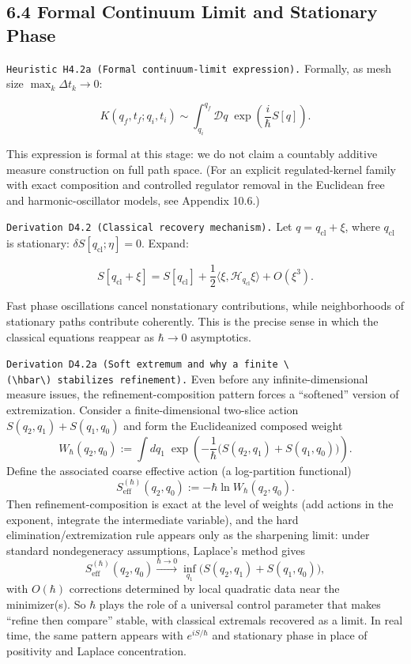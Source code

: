 \documentclass[
]{article}
\begin{document}
\subsection{6.4 Formal Continuum Limit and Stationary
Phase}\label{formal-continuum-limit-and-stationary-phase}

\texttt{Heuristic\ H4.2a\ (Formal\ continuum-limit\ expression).}
Formally, as mesh size \(\max_k\Delta t_k\to0\):

\[
K(q_f,t_f;q_i,t_i)\sim
\int_{q_i}^{q_f}\mathcal Dq\;
\exp\!\left(\frac{i}{\hbar}S[q]\right).
\]

This expression is formal at this stage: we do not claim a countably
additive measure construction on full path space. (For an explicit
regulated-kernel family with exact composition and controlled regulator
removal in the Euclidean free and harmonic-oscillator models, see
Appendix 10.6.)

\texttt{Derivation\ D4.2\ (Classical\ recovery\ mechanism).} Let
\(q=q_{\mathrm{cl}}+\xi\), where \(q_{\mathrm{cl}}\) is stationary:
\(\delta S[q_{\mathrm{cl}};\eta]=0\). Expand:

\[
S[q_{\mathrm{cl}}+\xi]
=S[q_{\mathrm{cl}}]
+\frac12\langle \xi,\mathcal H_{q_{\mathrm{cl}}}\xi\rangle
+O(\xi^3).
\]

Fast phase oscillations cancel nonstationary contributions, while
neighborhoods of stationary paths contribute coherently. This is the
precise sense in which the classical equations reappear as \(\hbar\to0\)
asymptotics.

\texttt{Derivation\ D4.2a\ (Soft\ extremum\ and\ why\ a\ finite\ \textbackslash{}(\textbackslash{}hbar\textbackslash{})\ stabilizes\ refinement).}
Even before any infinite-dimensional measure issues, the
refinement-composition pattern forces a ``softened'' version of
extremization. Consider a finite-dimensional two-slice action
\(S(q_2,q_1)+S(q_1,q_0)\) and form the Euclideanized composed weight \[
W_\hbar(q_2,q_0):=\int dq_1\;\exp\!\left(-\frac{1}{\hbar}\big(S(q_2,q_1)+S(q_1,q_0)\big)\right).
\] Define the associated coarse effective action (a log-partition
functional) \[
S_{\mathrm{eff}}^{(\hbar)}(q_2,q_0):=-\hbar\ln W_\hbar(q_2,q_0).
\] Then refinement-composition is exact at the level of weights (add
actions in the exponent, integrate the intermediate variable), and the
hard elimination/extremization rule appears only as the sharpening
limit: under standard nondegeneracy assumptions, Laplace's method gives
\[
S_{\mathrm{eff}}^{(\hbar)}(q_2,q_0)
\xrightarrow{\hbar\to0}
\inf_{q_1}\big(S(q_2,q_1)+S(q_1,q_0)\big),
\] with \(O(\hbar)\) corrections determined by local quadratic data near
the minimizer(s). So \(\hbar\) plays the role of a universal control
parameter that makes ``refine then compare'' stable, with classical
extremals recovered as a limit. In real time, the same pattern appears
with \(e^{iS/\hbar}\) and stationary phase in place of positivity and
Laplace concentration.
\end{document}
